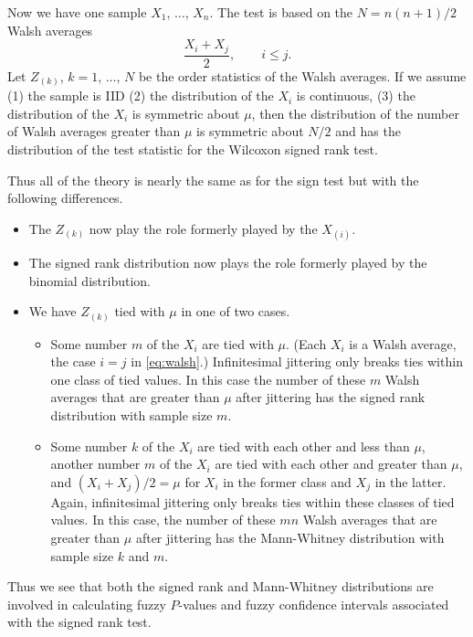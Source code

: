 \documentclass{article}
\begin{document}
Now we have one sample $X_1$, $\ldots$, $X_n$.
The test is based on the $N = n (n + 1) / 2$ Walsh averages
\begin{equation} \label{eq:walsh}
   \frac{X_i + X_j}{2}, \qquad i \le j.
\end{equation}
Let $Z_{(k)}$, $k = 1$, $\ldots$, $N$ be the order statistics of the
Walsh averages.  If we assume (1) the sample is IID
(2) the distribution of the $X_i$ is continuous,
(3) the distribution of the $X_i$ is symmetric about $\mu$,
then the distribution of the number of Walsh averages greater than $\mu$
is symmetric about $N / 2$ and has the distribution
of the test statistic for the Wilcoxon signed rank test.

Thus all of the theory is nearly the same as for the sign test
but with the following differences.
\begin{itemize}
\item The $Z_{(k)}$ now play the role formerly played by the $X_{(i)}$.
\item The signed rank distribution now plays the role formerly played by
    the binomial distribution.
\item We have $Z_{(k)}$ tied with $\mu$ in one of two cases.
\begin{itemize}
\item Some number $m$ of the $X_i$ are tied with $\mu$.  (Each $X_i$
    is a Walsh average, the case $i = j$ in \eqref{eq:walsh}.)
    Infinitesimal jittering only breaks ties within one class of tied
    values.  In this case the number of these $m$ Walsh averages that
    are greater than $\mu$ after jittering has the signed rank distribution
    with sample size $m$.
\item Some number $k$ of the $X_i$ are tied with each other and less than
    $\mu$, another number $m$ of the $X_i$ are tied with each other and
    greater than $\mu$, and $(X_i + X_j) / 2 = \mu$ for $X_i$ in the
    former class and $X_j$ in the latter.  Again,
    infinitesimal jittering only breaks ties within these classes of tied
    values.  In this case, the number of these $m n$ Walsh averages that
    are greater than $\mu$ after jittering has the Mann-Whitney distribution
    with sample size $k$ and $m$.
\end{itemize}
\end{itemize}
Thus we see that both the signed rank and Mann-Whitney distributions are
involved in calculating fuzzy $P$-values and fuzzy confidence intervals
associated with the signed rank test.
\end{document}
